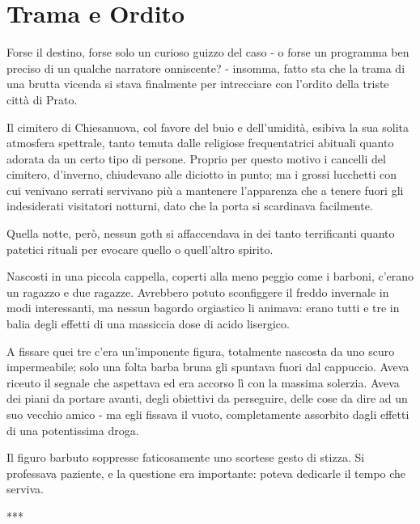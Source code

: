 \chapter{Trama e Ordito}


Forse il destino, forse solo un curioso guizzo del caso - o forse un programma ben preciso di un qualche narratore onniscente? - insomma, fatto sta che la trama di una brutta vicenda si stava finalmente per intrecciare con l'ordito della triste città di Prato.

Il cimitero di Chiesanuova, col favore del buio e dell'umidità, esibiva la sua solita atmosfera spettrale, tanto temuta dalle religiose frequentatrici abituali quanto adorata da un certo tipo di persone. Proprio per questo motivo i cancelli del cimitero, d'inverno, chiudevano alle diciotto in punto; ma i grossi lucchetti con cui venivano serrati servivano più a mantenere l'apparenza che a tenere fuori gli indesiderati visitatori notturni, dato che la porta si scardinava facilmente. 

Quella notte, però, nessun goth si affaccendava in dei tanto terrificanti quanto patetici rituali per evocare quello o quell'altro spirito.

Nascosti in una piccola cappella, coperti alla meno peggio come i barboni, c'erano un ragazzo e due ragazze. Avrebbero potuto sconfiggere il freddo invernale in modi interessanti, ma nessun bagordo orgiastico li animava: erano tutti e tre in balia degli effetti di una massiccia dose di acido lisergico.

A fissare quei tre c'era un'imponente figura, totalmente nascosta da uno scuro impermeabile; solo una folta barba bruna gli spuntava fuori dal cappuccio. Aveva riceuto il segnale che aspettava ed era accorso lì con la massima solerzia. Aveva dei piani da portare avanti, degli obiettivi da perseguire, delle cose da dire ad un suo vecchio amico - ma egli fissava il vuoto, completamente assorbito dagli effetti di una potentissima droga.

Il figuro barbuto soppresse faticosamente uno scortese gesto di stizza. Si professava paziente, e la questione era importante: poteva dedicarle il tempo che serviva.

***
